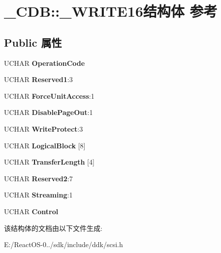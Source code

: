 \hypertarget{struct___c_d_b_1_1___w_r_i_t_e16}{}\section{\+\_\+\+C\+DB\+:\+:\+\_\+\+W\+R\+I\+T\+E16结构体 参考}
\label{struct___c_d_b_1_1___w_r_i_t_e16}
\subsection*{Public 属性}
\begin{DoxyCompactItemize}
\item 
\mbox{\label{struct___c_d_b_1_1___w_r_i_t_e16_ade83eb5cd3653da7982146069ccbb67a}} 
U\+C\+H\+AR {\bfseries Operation\+Code}
\item 
\mbox{\label{struct___c_d_b_1_1___w_r_i_t_e16_a6dcfa41e09281d0d506e84e021ee9aa7}} 
U\+C\+H\+AR {\bfseries Reserved1}\+:3
\item 
\mbox{\label{struct___c_d_b_1_1___w_r_i_t_e16_ad6e7d547737fd1909e2f019d2f59de74}} 
U\+C\+H\+AR {\bfseries Force\+Unit\+Access}\+:1
\item 
\mbox{\label{struct___c_d_b_1_1___w_r_i_t_e16_ab55a278d267e18cc2e2d17e03ba6e2eb}} 
U\+C\+H\+AR {\bfseries Disable\+Page\+Out}\+:1
\item 
\mbox{\label{struct___c_d_b_1_1___w_r_i_t_e16_a09abbe87ae3a9eceb4e4b4078ff3ecef}} 
U\+C\+H\+AR {\bfseries Write\+Protect}\+:3
\item 
\mbox{\label{struct___c_d_b_1_1___w_r_i_t_e16_adb8b3cac29ee554cd27e2e675721151e}} 
U\+C\+H\+AR {\bfseries Logical\+Block} \mbox{[}8\mbox{]}
\item 
\mbox{\label{struct___c_d_b_1_1___w_r_i_t_e16_a2434f8fa1f73246c24350d4b7441f603}} 
U\+C\+H\+AR {\bfseries Transfer\+Length} \mbox{[}4\mbox{]}
\item 
\mbox{\label{struct___c_d_b_1_1___w_r_i_t_e16_a088cdf817a6dfd5dcd2bb397607dc131}} 
U\+C\+H\+AR {\bfseries Reserved2}\+:7
\item 
\mbox{\label{struct___c_d_b_1_1___w_r_i_t_e16_a7bb7d10a53977b8f119b53c13de30f72}} 
U\+C\+H\+AR {\bfseries Streaming}\+:1
\item 
\mbox{\label{struct___c_d_b_1_1___w_r_i_t_e16_abdea84884671a12e6c71299ddd89d106}} 
U\+C\+H\+AR {\bfseries Control}
\end{DoxyCompactItemize}


该结构体的文档由以下文件生成\+:\begin{DoxyCompactItemize}
\item 
E\+:/\+React\+O\+S-\/0../sdk/include/ddk/scsi.\+h\end{DoxyCompactItemize}
